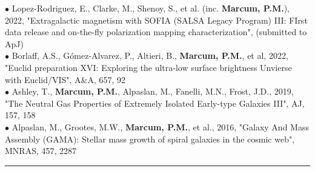 {\scriptsize{$\bullet$}} Lopez-Rodriguez, E., Clarke, M., Shenoy, S., et al. (inc. \textbf{Marcum, P.M.}), 2022, "Extragalactic magnetism with SOFIA (SALSA Legacy Program) III: FIrst data release and on-the-fly polarization mapping characterization", (submitted to ApJ)\\
{\scriptsize{$\bullet$}} Borlaff, A.S., G{\'o}mez-Alvarez, P., Altieri, B., \textbf{Marcum, P.M.}, et al, 2022, "Euclid preparation XVI: Exploring the ultra-low surface brightness Unvierse with Euclid/VIS", A\&A, 657, 92\\
{\scriptsize{$\bullet$}} Ashley, T., \textbf{Marcum, P.M.}, Alpaslan, M., Fanelli, M.N., Frost, J.D., 2019, "The Neutral Gas Properties of Extremely Isolated Early-type Galaxies III", AJ, 157, 158\\
{\scriptsize{$\bullet$}} Alpaslan, M., Grootes, M.W., \textbf{Marcum, P.M.}, et al., 2016, "Galaxy And Mass Assembly (GAMA): Stellar mass growth of spiral galaxies in the cosmic web", MNRAS, 457, 2287
\medskip \hrule \vspace{5pt} \medskip